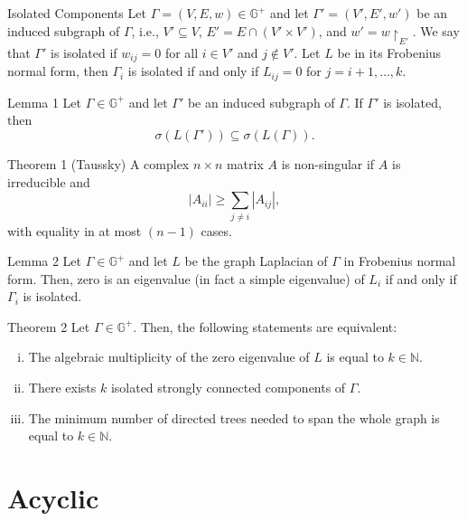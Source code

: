 \documentclass{beamer}
\newcommand\abs[1]{\left|#1\right|}
\begin{document}
\begin{frame}{Isolated Components}
Let $\Gamma=(V,E,w)\in\mathbb{G^{+}}$ and let $\Gamma'=(V',E',w')$ be an induced subgraph of $\Gamma$, i.e., $V'\subseteq V$, $E'=E\cap(V'\times V')$, and $w'=w\restriction_{E'}$.
\vfill
We say that $\Gamma'$ is isolated if $w_{ij}=0$ for all $i\in V'$ and $j\notin V'$.
\vfill
Let $L$ be in its Frobenius normal form, then $\Gamma_{i}$ is isolated if and only if $L_{ij}=0$ for $j=i+1,\ldots,k$.
\end{frame}

\begin{frame}{Lemma 1}
Let $\Gamma\in\mathbb{G}^{+}$ and let $\Gamma'$ be an induced subgraph of $\Gamma$.
If $\Gamma'$ is isolated, then
\[
\sigma(L(\Gamma'))\subseteq\sigma(L(\Gamma)).
\]
\end{frame}

\begin{frame}{Theorem 1 (Taussky)}
A complex $n\times n$ matrix $A$ is non-singular if $A$ is irreducible and
\[
\abs{A_{ii}}\geq\sum\limits_{j\neq i}\abs{A_{ij}},
\]
with equality in at most $(n-1)$ cases.
\end{frame}

\begin{frame}{Lemma 2}
Let $\Gamma\in\mathbb{G}^{+}$ and let $L$ be the graph Laplacian of $\Gamma$ in Frobenius normal form.
\vfill
Then, zero is an eigenvalue (in fact a simple eigenvalue) of $L_{i}$ if and only if $\Gamma_{i}$ is isolated.
\end{frame}

\begin{frame}{Theorem 2}
Let $\Gamma\in\mathbb{G}^{+}$. Then, the following statements are equivalent:
\vfill
\begin{enumerate}[i.]
\item The algebraic multiplicity of the zero eigenvalue of $L$ is equal to $k\in\mathbb{N}$.
\vfill
\item	There exists $k$ isolated strongly connected components of $\Gamma$.
\vfill
\item	The minimum number of directed trees needed to span the whole graph is equal to $k\in\mathbb{N}$.
\end{enumerate}
\end{frame}

\section{Acyclic}
\end{document}
